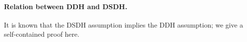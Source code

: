 \paragraph{Relation between DDH and DSDH.}
It is known that the DSDH assumption implies the DDH assumption; we give a self-contained proof here.







